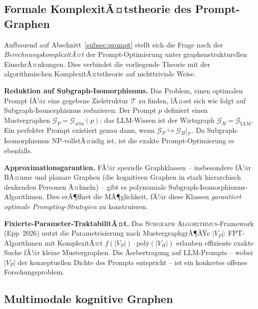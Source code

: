 ﻿\documentclass[12pt,a4paper]{article}
\theoremstyle{plain}
\theoremstyle{definition}
\theoremstyle{remark}
\newcommand{\GG}{\mathcal{G}}
\newcommand{\SA}{\textnormal{\textsc{Subgraph Algorithmus}}}
\begin{document}
\subsection{Formale KomplexitÃ¤tstheorie des Prompt-Graphen}
\label{subsec:komplexitaet_prompt}

Aufbauend auf Abschnitt~\ref{subsec:prompt} stellt sich die Frage nach der \emph{BerechnungskomplexitÃ¤t} der Prompt-Optimierung unter graphenstrukturellen EinschrÃ¤nkungen. Dies verbindet die vorliegende Theorie mit der algorithmischen KomplexitÃ¤tstheorie auf nichttriviale Weise.

\textbf{Reduktion auf Subgraph-Isomorphismus.} Das Problem, einen optimalen Prompt fÃ¼r eine gegebene Zielstruktur $\mathcal{T}$ zu finden, lÃ¤sst sich wie folgt auf Subgraph-Isomorphismus reduzieren: Der Prompt $p$ definiert einen Mustergraphen $\GG_P = \GG_{\text{attn}}(p)$; das LLM-Wissen ist der Wirtsgraph $\GG_H = \GG_{\text{LLM}}$. Ein perfekter Prompt existiert genau dann, wenn $\GG_P \hookrightarrow \GG_H|_\mathcal{T}$. Da Subgraph-Isomorphismus NP-vollstÃ¤ndig ist, ist die exakte Prompt-Optimierung es ebenfalls.

\textbf{Approximationsgarantien.} FÃ¼r spezielle Graphklassen -- insbesondere fÃ¼r BÃ¤ume und planare Graphen (die kognitiven Graphen in stark hierarchisch denkenden Personen Ã¤hneln) -- gibt es polynomiale Subgraph-Isomorphismus-Algorithmen. Dies erÃ¶ffnet die MÃ¶glichkeit, fÃ¼r diese Klassen \emph{garantiert optimale Prompting-Strategien} zu konstruieren.

\textbf{Fixierte-Parameter-TraktabilitÃ¤t.} Das \SA{}-Frame\-work (Epp~2026) nutzt die Parametrisierung nach MustergraphgrÃ¶ÃŸe $|V_P|$: FPT-Algorithmen mit KomplexitÃ¤t $f(|V_P|) \cdot \text{poly}(|V_H|)$ erlauben effiziente exakte Suche fÃ¼r kleine Mustergraphen. Die Ãœbertragung auf LLM-Prompts -- wobei $|V_P|$ der konzeptuellen Dichte des Prompts entspricht -- ist ein konkretes offenes Forschungsproblem.

\subsection{Multimodale kognitive Graphen}
\label{subsec:multimodal}
\end{document}
